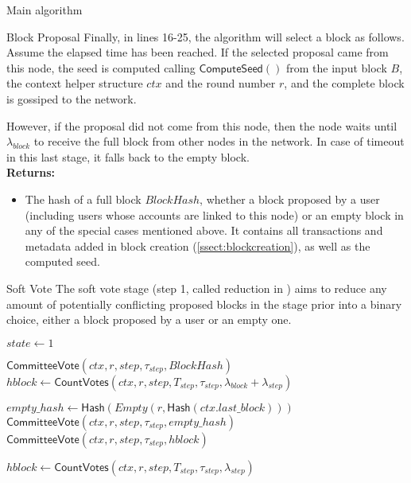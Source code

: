 \documentclass[10pt,a4paper]{article}
\begin{document}
\begin{section}{Main algorithm}
\begin{subsection}{Block Proposal}
Finally, in lines 16-25, the algorithm will select a block as 
follows. Assume the elapsed time has been reached. 
If the selected proposal came from this node, the seed is computed 
calling $\mathsf{ComputeSeed}()$ from the input block $B$, the context helper structure 
$ctx$ and the round number $r$, and the complete block is gossiped to the network.

However, if the proposal did not come from this node, then the node 
waits until $\lambda_{block}$ to receive the full block from other nodes
in the network.
In case of timeout in this last stage, it falls back to the empty block.\\

\noindent \textbf{Returns:}
\begin{itemize}
    \item The hash of a full block $BlockHash$, whether a block proposed by a user (including users 
    whose accounts are linked to this node) or an empty block in any of the special 
    cases mentioned above. It contains all transactions and metadata added in block creation (\ref{ssect:blockcreation}), 
    as well as the computed seed.
  \end{itemize}
\end{subsection}
\begin{subsection}{Soft Vote}\label{ssect:softvote}
The soft vote stage (step 1, called reduction in \cite{DBLP:conf/sosp/GiladHMVZ17}) aims to reduce 
any amount of potentially conflicting proposed blocks in the stage prior into a binary 
choice, either a block proposed by a user or an empty one.

\begin{algorithm}[H]
    \begin{algorithmic}[H]
    \State $state \gets 1$
    
    \State $\mathsf{CommitteeVote}(ctx, r, step, \tau_{step}, BlockHash)$
    \State $hblock \gets \mathsf{CountVotes}(ctx, r, step, T_{step}, \tau_{step}, \lambda_{block} + \lambda_{step})$

    \State $empty\_hash \gets \mathsf{Hash}(Empty(r, \mathsf{Hash}(ctx.last\_block)))$ 
        \State $\mathsf{CommitteeVote}(ctx, r, step, \tau_{step}, empty\_hash)$
    \Else
        {\State $\mathsf{CommitteeVote}(ctx, r, step, \tau_{step}, hblock)$}
    \EndIf\

    \State $hblock \gets \mathsf{CountVotes}(ctx, r, step, T_{step}, \tau_{step}, \lambda_{step})$ 


\end{algorithmic}
\end{algorithm}
\end{subsection}
\end{section}
\end{document}

